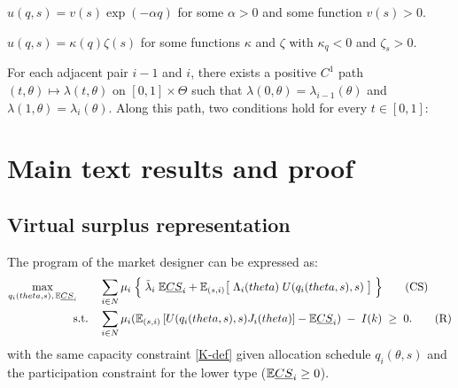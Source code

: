 \documentclass[master.tex]{subfiles}
\begin{document}
\renewcommand{\theassumption}{CARA}
\begin{assumption}\label{ass:CARA}
$u(q,s) = v(s)\exp(-\alpha q)$ for some $\alpha > 0$ and some function $v(s) > 0$.
\end{assumption}
\renewcommand{\theassumption}{\arabic{assumption}}


\renewcommand{\theassumption}{Multi}
\begin{assumption}\label{ass:mult}
$u(q,s) = \kappa(q)\zeta(s)$ for some functions $\kappa$ and $\zeta$ with $\kappa_q < 0$ and $\zeta_s > 0$.
\end{assumption}
\renewcommand{\theassumption}{\arabic{assumption}}


\renewcommand{\theassumption}{Order}
\begin{assumption}\label{ass:ordered-path}
For each adjacent pair \(i-1\) and \(i\), there exists a positive \(C^1\) path $(t,\theta)\mapsto \lambda(t,\theta) \text{ on }[0,1]\times\Theta$ such that \(\lambda(0,\theta)=\lambda_{i-1}(\theta)\) and \(\lambda(1,\theta)=\lambda_i(\theta)\). Along this path, two conditions hold for every \(t\in[0,1]\):
\end{assumption}
\renewcommand{\theassumption}{\arabic{assumption}}

\section{Main text results and proof}

\subsection{Virtual surplus representation}

\begin{lemma}\label{lem:Transfer}
The program of the market designer can be expressed as: 
\begin{align*}
\max_{q_i(theta,s), \, \mathbb{E}\underline{CS}_i}  \quad\quad 
&  \sum_{i \in N}  \mu_i   \; 
\Big\{ \;  \tilde{\lambda}_i \;\mathbb{E}\underline{CS}_i 
      + \mathbb{E}_{(s,i)} \big[\; \Lambda_i(theta)\;  U(q_i(theta,s),s)\; \big] \;  \Big\}
\tag{CS}\label{CSmd-def}  \\
\text{s.t.} \quad
& \sum_{i\in N}\mu_i
(\mathbb{E}_{(s,i)}\left[ U(q_i(theta,s),s) J_i(theta) \right] - \mathbb{E}\underline{CS}_i)\;-\; I(k)
\;\ge\; 0. \tag{R}\label{Rmd-def}
\end{align*}
with the same capacity constraint \eqref{K-def} given allocation schedule $q_i(\theta,s)$ and the participation constraint for the lower type ($\mathbb{E}\underline{CS}_i\ge 0$).
\end{lemma}
\end{document}
